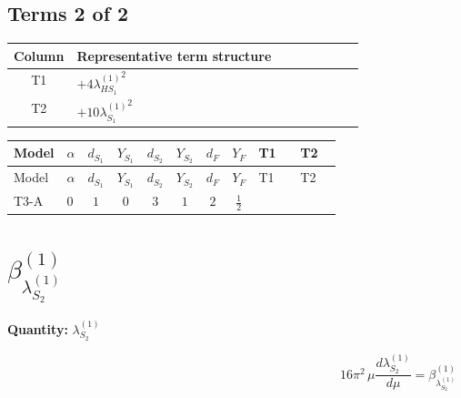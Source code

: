 \documentclass[8pt]{article}
\begin{document}
\begin{landscape}
\subsection*{Terms 2 of 2}
\begin{center}
\begin{tabular}{@{}c >{\raggedright\arraybackslash}p{0.82\linewidth}@{}}
\toprule
Column & Representative term structure \\
\midrule
T1 & \(\displaystyle +4 {\lambda_{HS_1}^{(1)}}^2\) \\
\midrule
T2 & \(\displaystyle +10 {\lambda_{S_1}^{(1)}}^2\) \\
\midrule
\bottomrule
\end{tabular}
\end{center}
\smallskip
\tiny
\begin{longtable}{@{}llcccccc >{\raggedright\arraybackslash}p{0.21\linewidth} >{\raggedright\arraybackslash}p{0.21\linewidth}@{}}
\toprule
Model & $\alpha$ & $d_{S_1}$ & $Y_{S_1}$ & $d_{S_2}$ & $Y_{S_2}$ & $d_F$ & $Y_F$ & T1 & T2 \\
\midrule
\endfirsthead
\toprule
Model & $\alpha$ & $d_{S_1}$ & $Y_{S_1}$ & $d_{S_2}$ & $Y_{S_2}$ & $d_F$ & $Y_F$ & T1 & T2 \\
\midrule
\endhead
T3-A & $0$ & $1$ & $0$ & $3$ & $1$ & $2$ & $\frac{1}{2}$ & \scriptsize\adjustbox{max width=\linewidth}{$\begin{gathered} +4 {\lambda_{HS_1}^{(1)}}^2\end{gathered}$} & \scriptsize\adjustbox{max width=\linewidth}{$\begin{gathered} +10 {\lambda_{S_1}^{(1)}}^2\end{gathered}$} \\
\midrule
\bottomrule
\end{longtable}
\clearpage
\section*{$\beta_{\lambda_{S_2}^{(1)}}^{(1)}$}
\noindent\textbf{Quantity: }$\lambda_{S_2}^{(1)}$\par\smallskip
\[16\pi^2\,\mu\frac{d \lambda_{S_2}^{(1)}}{d\mu}=\beta_{\lambda_{S_2}^{(1)}}^{(1)}\]

\end{landscape}
\end{document}
